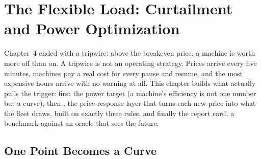 \chapter{The Flexible Load: Curtailment and Power Optimization}
\label{ch:flexload}

Chapter~4 ended with a tripwire: above the breakeven price, a machine is worth more off than on. A tripwire is not an operating strategy. Prices arrive every five minutes, machines pay a real cost for every pause and resume, and the most expensive hours arrive with no warning at all. This chapter builds what actually pulls the trigger: first the power target (a machine's efficiency is not one number but a curve), then , the price-response layer that turns each new price into what the fleet draws, built on exactly three rules, and finally the report card, a benchmark against an oracle that sees the future.

\section{One Point Becomes a Curve}

